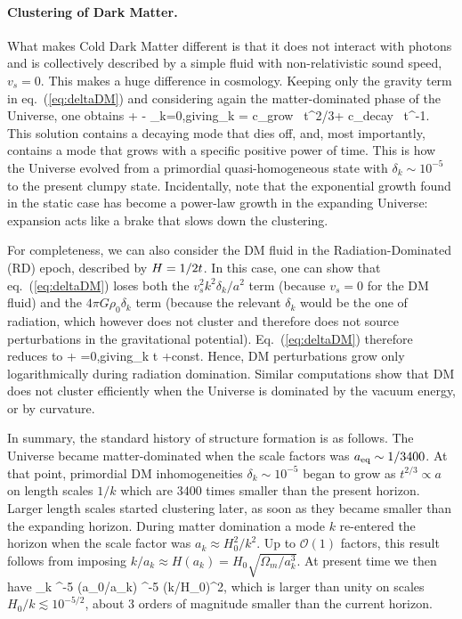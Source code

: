 \paragraph{Clustering of Dark Matter.}
What makes Cold Dark Matter different is that it does not interact with photons and is collectively described by a
simple fluid with non-relativistic sound speed, $v_s = 0$. This makes a huge difference in cosmology.
Keeping only the gravity term in eq.~(\ref{eq:deltaDM}) and considering again the matter-dominated phase of the Universe, one obtains
\beq\label{eq:deltaDM(t)}
 + -  \delta_k=0,\qquad\hbox{giving}\qquad \delta_k = c_{\rm grow}~ t^{2/3}+
c_{\rm decay}~ t^{-1}.
\eeq
This solution contains a decaying mode that dies off, and, most importantly, 
contains a mode that grows with a specific positive power of time.
This is how the Universe evolved from a primordial quasi-homogeneous state with $\delta_k \sim 10^{-5}$ to the present clumpy state.
Incidentally, note that the exponential growth found in the static case has become a power-law growth in
the expanding Universe: expansion acts like a brake that slows down the clustering.

\medskip

For completeness, we can also consider the DM fluid in the Radiation-Dominated (RD) epoch, described by $H=1/2t$. In this case, one can show that eq.~(\ref{eq:deltaDM}) loses both the $v_s^2 k^2 \delta_k/a^2$ term (because $v_s = 0$ for the DM fluid) and the $4\pi G \rho_0 \delta_k$ term (because the relevant $\delta_k$ would be the one of radiation, which however does not cluster and therefore does not source perturbations in the gravitational potential).  Eq.~(\ref{eq:deltaDM}) therefore reduces to
\beq 
{} +  =0,\qquad\hbox{giving}\qquad \delta_k \propto \ln t +\hbox{const}.
\eeq
Hence, DM perturbations grow only logarithmically during radiation domination. Similar computations show that DM does not  cluster efficiently when the Universe is dominated by the vacuum energy, or by curvature.


\medskip

In summary, the standard history of structure formation is as follows. The Universe became matter-dominated when the scale factors was $a_{\rm eq} \sim 1/3400$.  
At that point, primordial DM inhomogeneities $\delta_k \sim 10^{-5}$ 
began to grow as $t^{2/3} \propto a$ on length scales $1/k$ which are 3400 times smaller than the present horizon.
Larger length scales started clustering later, as soon as they became smaller than the expanding horizon.
During matter domination a mode $k$ re-entered the horizon when the scale factor was $a_k \approx H_0^2/k^2$.
Up to ${\mathcal O}(1)$ factors, this result follows from imposing $k/a_k \approx H(a_k) = H_0 \sqrt{\Omega_m/a_k^3}$.
At present time we then have
\beq \delta_k  ^{-5} (a_0/a_k) ^{-5} (k/H_0)^2,\label{eq:deltaktoday}
\eeq
which is larger than unity on scales $H_0/k \lesssim  10^{-5/2}$, about 3 orders of magnitude smaller than the current horizon.


